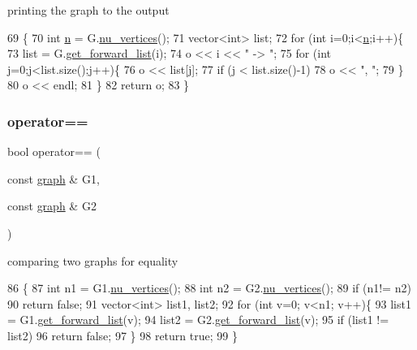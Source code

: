printing the graph to the output 


\begin{DoxyCode}
69 \{
70   \textcolor{keywordtype}{int} \hyperlink{classgraph_ac8b3474ce95c04087c312508ec1443b6}{n} = G.\hyperlink{classgraph_a70a6e0e4e0a874ab122405abd38f83cd}{nu\_vertices}();
71   vector<int> list;
72   \textcolor{keywordflow}{for} (\textcolor{keywordtype}{int} i=0;i<\hyperlink{classgraph_ac8b3474ce95c04087c312508ec1443b6}{n};i++)\{
73     list = G.\hyperlink{classgraph_aa8fbee52a7b3604dbbd9175040c7ead5}{get\_forward\_list}(i);
74     o << i << \textcolor{stringliteral}{" -> "};
75     \textcolor{keywordflow}{for} (\textcolor{keywordtype}{int} j=0;j<list.size();j++)\{
76       o << list[j];
77       \textcolor{keywordflow}{if} (j < list.size()-1)
78         o << \textcolor{stringliteral}{", "};
79     \}
80     o << endl;
81   \}
82   \textcolor{keywordflow}{return} o;
83 \}
\end{DoxyCode}
\mbox{\label{classgraph_a156c8acaca113a7e5cc8d918dd1fc3f3}} 
\subsubsection{\texorpdfstring{operator==}{operator==}}
{\footnotesize\ttfamily bool operator== (\begin{DoxyParamCaption}\item[{const \hyperlink{classgraph}{graph} \&}]{G1,  }\item[{const \hyperlink{classgraph}{graph} \&}]{G2 }\end{DoxyParamCaption})\hspace{0.3cm}{\ttfamily [friend]}}



comparing two graphs for equality 


\begin{DoxyCode}
86 \{
87   \textcolor{keywordtype}{int} n1 = G1.\hyperlink{classgraph_a70a6e0e4e0a874ab122405abd38f83cd}{nu\_vertices}();
88   \textcolor{keywordtype}{int} n2 = G2.\hyperlink{classgraph_a70a6e0e4e0a874ab122405abd38f83cd}{nu\_vertices}();
89   \textcolor{keywordflow}{if} (n1!= n2)
90     \textcolor{keywordflow}{return} \textcolor{keyword}{false};
91   vector<int> list1, list2;
92   \textcolor{keywordflow}{for} (\textcolor{keywordtype}{int} v=0; v<n1; v++)\{
93     list1 = G1.\hyperlink{classgraph_aa8fbee52a7b3604dbbd9175040c7ead5}{get\_forward\_list}(v);
94     list2 = G2.\hyperlink{classgraph_aa8fbee52a7b3604dbbd9175040c7ead5}{get\_forward\_list}(v);
95     \textcolor{keywordflow}{if} (list1 != list2)
96       \textcolor{keywordflow}{return} \textcolor{keyword}{false};
97   \}
98   \textcolor{keywordflow}{return} \textcolor{keyword}{true};
99 \}
\end{DoxyCode}


